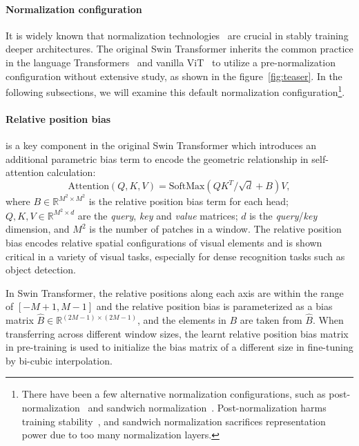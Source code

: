 \documentclass[10pt,twocolumn,letterpaper]{article}
\begin{document}
\paragraph{Normalization configuration} It is widely known that normalization technologies~\cite{ioffe2015batch, ba2016layer, wu2018group, ulyanov2017instance} are crucial in stably training deeper architectures. The original Swin Transformer inherits the common practice in the language Transformers~\cite{radford2019language} and vanilla ViT~\cite{dosovitskiy2020vit} to utilize a pre-normalization configuration without extensive study, as shown in the figure~\ref{fig:teaser}. In the following subsections, we will examine this default normalization configuration\footnote{There have been a few alternative normalization configurations, such as post-normalization~\cite{vaswani2017attention} and sandwich normalization~\cite{ding2021cogview}. Post-normalization harms training stability~\cite{xiongLN2020}, and sandwich normalization sacrifices representation power due to too many normalization layers.}. 

\paragraph{Relative position bias} is a key component in the original Swin Transformer which introduces an additional parametric bias term to encode the geometric relationship in self-attention calculation:
\begin{equation}
\label{eq.att}
    \text{Attention}(Q, K, V) = \text{SoftMax}(QK^T/\sqrt{d}+B)V,
\end{equation}
where $B \in \mathbb{R}^{M^2 \times M^2}$ is the relative position bias term for each head; $Q, K, V \in \mathbb{R}^{M^2\times d}$ are the \emph{query}, \emph{key} and \emph{value} matrices; $d$ is the \emph{query}/\emph{key} dimension, and $M^2$ is the number of patches in a window. The relative position bias encodes relative spatial configurations of visual elements and is shown critical in a variety of visual tasks, especially for dense recognition tasks such as object detection.

In Swin Transformer, the relative positions along each axis are within the range of $[-M+1, M-1]$ and the relative position bias is parameterized as a bias matrix $\hat{B} \in \mathbb{R}^{(2M-1)\times (2M-1)}$, and the elements in $B$ are taken from $\hat{B}$. When transferring across different window sizes, the learnt relative position bias matrix in pre-training is used to initialize the bias matrix of a different size in fine-tuning by bi-cubic interpolation.
\end{document}
